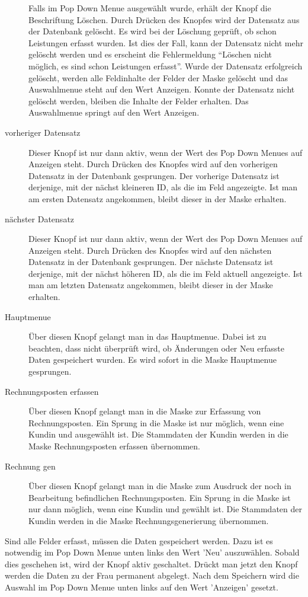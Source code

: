 \begin{description}
Falls im Pop Down Menue  ausgewählt wurde, erhält der Knopf die
Beschriftung Löschen. Durch Drücken des Knopfes wird der Datensatz aus der
Datenbank gelöscht. Es wird bei der Löschung geprüft, ob schon Leistungen
erfasst wurden. Ist dies der Fall, kann der Datensatz nicht mehr gelöscht 
werden und es erscheint die Fehlermeldung ``Löschen nicht möglich, es sind
schon Leistungen erfasst''. Wurde der Datensatz erfolgreich gelöscht, werden
alle Feldinhalte der Felder der Maske gelöscht und das Auswahlmenue
steht auf den Wert Anzeigen. Konnte der Datensatz nicht gelöscht werden,
bleiben die Inhalte der Felder erhalten. Das Auswahlmenue springt auf den 
Wert Anzeigen.
\item[vorheriger Datensatz] Dieser Knopf ist nur dann aktiv, wenn der Wert
des Pop Down Menues auf Anzeigen steht. Durch Drücken des Knopfes wird auf
den vorherigen Datensatz in der Datenbank gesprungen. Der vorherige Datensatz
ist derjenige, mit der nächst kleineren ID, als die im Feld 
angezeigte. Ist
man am ersten Datensatz angekommen, bleibt dieser in der Maske erhalten.
\item[nächster Datensatz] Dieser Knopf ist nur dann aktiv, wenn der Wert
des Pop Down Menues auf Anzeigen steht. Durch Drücken des Knopfes wird auf
den nächsten Datensatz in der Datenbank gesprungen. Der nächste Datensatz
ist derjenige, mit der nächst höheren ID, als die im Feld 
 aktuell angezeigte. Ist
man am letzten Datensatz angekommen, bleibt dieser in der Maske erhalten.
\item[Hauptmenue] Über diesen Knopf gelangt man in das Hauptmenue.
Dabei ist zu beachten, dass nicht überprüft wird, ob Änderungen oder Neu
erfasste Daten gespeichert wurden. Es wird sofort in die Maske Hauptmenue
gesprungen.
\item[Rechnungsposten erfassen] Über diesen Knopf gelangt man in die Maske
zur Erfassung von Rechnungsposten. Ein Sprung in die Maske ist nur 
möglich, wenn eine Kundin und  ausgewählt ist. Die 
Stammdaten der Kundin werden in die Maske Rechnungsposten erfassen übernommen.
\item[Rechnung gen] Über diesen Knopf gelangt man in die Maske zum Ausdruck
der noch in Bearbeitung befindlichen Rechnungsposten. Ein Sprung in die Maske
ist nur dann möglich, wenn eine Kundin und  gewählt ist. Die
Stammdaten der Kundin werden in die Maske Rechnungsgenerierung übernommen.
\end{description}

Sind alle Felder erfasst, müssen die Daten gespeichert werden. Dazu ist
es notwendig im Pop Down Menue unten links den Wert 'Neu' auszuwählen.
Sobald dies geschehen ist, wird der Knopf  aktiv 
geschaltet. Drückt man jetzt den Knopf  werden die Daten
zu der Frau permanent abgelegt. Nach dem Speichern wird die Auswahl im 
Pop Down Menue unten links auf den Wert 'Anzeigen' gesetzt.




